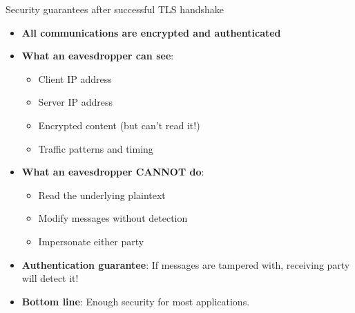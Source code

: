 \documentclass[aspectratio=169, lualatex, handout]{beamer}
\begin{document}
\begin{frame}{Security guarantees after successful TLS handshake}
	\begin{itemize}
		\item \textbf{All communications are encrypted and authenticated}
		\item \textbf{What an eavesdropper can see}:
		      \begin{itemize}
			      \item Client IP address
			      \item Server IP address
			      \item Encrypted content (but can't read it!)
			      \item Traffic patterns and timing
		      \end{itemize}
		\item \textbf{What an eavesdropper CANNOT do}:
		      \begin{itemize}
			      \item Read the underlying plaintext
			      \item Modify messages without detection
			      \item Impersonate either party
		      \end{itemize}
		\item \textbf{Authentication guarantee}: If messages are tampered with, receiving party will detect it!
		\item \textbf{Bottom line}: Enough security for most applications.
	\end{itemize}
\end{frame}
\end{document}
